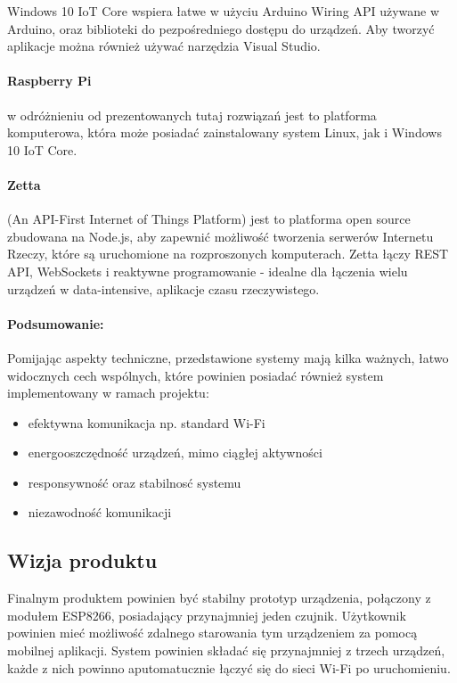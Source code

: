 Windows 10 IoT Core wspiera łatwe w użyciu Arduino Wiring API używane w Arduino, oraz biblioteki do pezpośredniego dostępu do urządzeń. Aby tworzyć aplikacje można również używać narzędzia Visual Studio.


\paragraph{Raspberry Pi}\cite{raspberry-www} w odróżnieniu od prezentowanych tutaj rozwiązań jest to platforma komputerowa, która może posiadać zainstalowany system Linux, jak i Windows 10 IoT Core.

\paragraph{Zetta}\cite{zetta-www} (An API-First Internet of Things Platform) jest to platforma open source zbudowana na Node.js, aby zapewnić możliwość tworzenia serwerów Internetu Rzeczy, które są uruchomione na rozproszonych komputerach. Zetta łączy REST API, WebSockets i reaktywne programowanie - idealne dla łączenia wielu urządzeń w data-intensive, aplikacje czasu rzeczywistego.

\paragraph{Podsumowanie:} Pomijając aspekty techniczne, przedstawione systemy mają kilka ważnych, łatwo widocznych cech wspólnych, które powinien posiadać również system implementowany w ramach projektu:

\begin{itemize}
	\item efektywna komunikacja np. standard Wi-Fi
	\item energooszczędność urządzeń, mimo ciągłej aktywności
	\item responsywność oraz stabilnosć systemu
	\item niezawodność komunikacji
\end{itemize}


\subsection{Wizja produktu}
Finalnym produktem powinien być stabilny prototyp urządzenia, połączony z modułem ESP8266, posiadający przynajmniej jeden czujnik. Użytkownik powinien mieć możliwość zdalnego starowania tym urządzeniem za pomocą mobilnej aplikacji. System powinien składać się przynajmniej z trzech urządzeń, każde z nich powinno aputomatucznie łączyć się do sieci Wi-Fi po uruchomieniu. 

